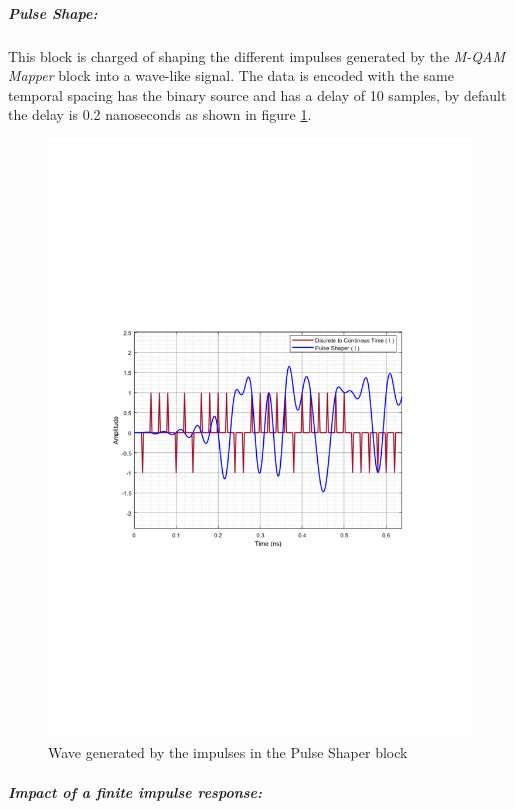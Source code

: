 \subparagraph*{Pulse Shape:}

This block is charged of shaping the different impulses generated by the \textit{M-QAM Mapper} block into a wave-like signal. The data is encoded with the same temporal spacing has the binary source and has a delay of 10 samples, by default the delay is 0.2 nanoseconds as shown in figure \ref{TransmitterPulseShaper}.

\begin{figure}[h]
	\centering
    \includegraphics[clip, trim=0.5cm 9cm 0.5cm 9cm, width=\textwidth]{./lib/m_qam_transmitter/figures/TransmitterPulseShaper.pdf}
    \caption{Wave generated by the impulses in the Pulse Shaper block}\label{TransmitterPulseShaper}
\end{figure}

\subparagraph*{Impact of a finite impulse response:}

